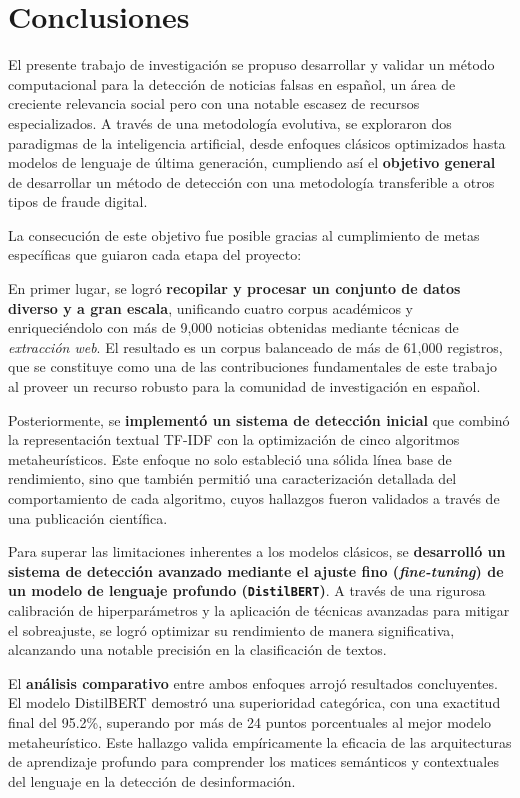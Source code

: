 \chapter{Conclusiones}
\label{cap:Conclusiones}

El presente trabajo de investigación se propuso desarrollar y validar un método computacional para la detección de noticias falsas en español, un área de creciente relevancia social pero con una notable escasez de recursos especializados. A través de una metodología evolutiva, se exploraron dos paradigmas de la inteligencia artificial, desde enfoques clásicos optimizados hasta modelos de lenguaje de última generación, cumpliendo así el \textbf{objetivo general} de desarrollar un método de detección con una metodología transferible a otros tipos de fraude digital.

La consecución de este objetivo fue posible gracias al cumplimiento de metas específicas que guiaron cada etapa del proyecto:

En primer lugar, se logró \textbf{recopilar y procesar un conjunto de datos diverso y a gran escala}, unificando cuatro corpus académicos y enriqueciéndolo con más de 9,000 noticias obtenidas mediante técnicas de \textit{extracción web}. El resultado es un corpus balanceado de más de 61,000 registros, que se constituye como una de las contribuciones fundamentales de este trabajo al proveer un recurso robusto para la comunidad de investigación en español.

Posteriormente, se \textbf{implementó un sistema de detección inicial} que combinó la representación textual TF-IDF con la optimización de cinco algoritmos metaheurísticos. Este enfoque no solo estableció una sólida línea base de rendimiento, sino que también permitió una caracterización detallada del comportamiento de cada algoritmo, cuyos hallazgos fueron validados a través de una publicación científica.

Para superar las limitaciones inherentes a los modelos clásicos, se \textbf{desarrolló un sistema de detección avanzado mediante el ajuste fino (\textit{fine-tuning}) de un modelo de lenguaje profundo (\texttt{DistilBERT})}. A través de una rigurosa calibración de hiperparámetros y la aplicación de técnicas avanzadas para mitigar el sobreajuste, se logró optimizar su rendimiento de manera significativa, alcanzando una notable precisión en la clasificación de textos.

El \textbf{análisis comparativo} entre ambos enfoques arrojó resultados concluyentes. El modelo DistilBERT demostró una superioridad categórica, con una exactitud final del 95.2\%, superando por más de 24 puntos porcentuales al mejor modelo metaheurístico. Este hallazgo valida empíricamente la eficacia de las arquitecturas de aprendizaje profundo para comprender los matices semánticos y contextuales del lenguaje en la detección de desinformación.

